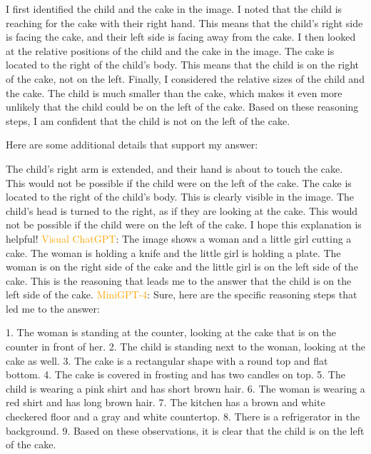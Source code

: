 \begin{enumerate}
        I first identified the child and the cake in the image.
        I noted that the child is reaching for the cake with their right hand. This means that the child's right side is facing the cake, and their left side is facing away from the cake.
        I then looked at the relative positions of the child and the cake in the image. The cake is located to the right of the child's body. This means that the child is on the right of the cake, not on the left.
        Finally, I considered the relative sizes of the child and the cake. The child is much smaller than the cake, which makes it even more unlikely that the child could be on the left of the cake.
        Based on these reasoning steps, I am confident that the child is not on the left of the cake.

        Here are some additional details that support my answer:

        The child's right arm is extended, and their hand is about to touch the cake. This would not be possible if the child were on the left of the cake.
        The cake is located to the right of the child's body. This is clearly visible in the image.
        The child's head is turned to the right, as if they are looking at the cake. This would not be possible if the child were on the left of the cake.
        I hope this explanation is helpful!
        \subitem \textcolor{orange}{Visual ChatGPT}: The image shows a woman and a little girl cutting a cake. The woman is holding a knife and the little girl is holding a plate. The woman is on the right side of the cake and the little girl is on the left side of the cake. This is the reasoning that leads me to the answer that the child is on the left side of the cake.
        \subitem \textcolor{orange}{MiniGPT-4}: Sure, here are the specific reasoning steps that led me to the answer:

        1. The woman is standing at the counter, looking at the cake that is on the counter in front of her.
        2. The child is standing next to the woman, looking at the cake as well.
        3. The cake is a rectangular shape with a round top and flat bottom.
        4. The cake is covered in frosting and has two candles on top.
        5. The child is wearing a pink shirt and has short brown hair.
        6. The woman is wearing a red shirt and has long brown hair.
        7. The kitchen has a brown and white checkered floor and a gray and white countertop.
        8. There is a refrigerator in the background.
        9. Based on these observations, it is clear that the child is on the left of the cake.
    \end{enumerate}
